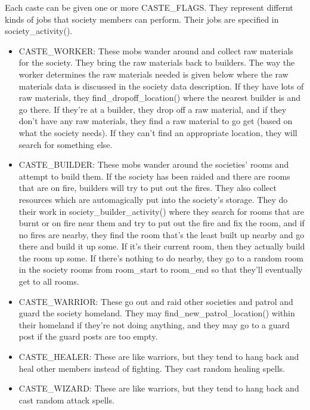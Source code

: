 Each caste can be given one or more CASTE\_FLAGS. They represent differnt
kinds of jobs that society members can perform. Their jobs are specified
in society\_activity().

\begin{itemize}

\item CASTE\_WORKER: These mobs wander around and collect raw materials for
  the society. They bring the raw materials back to builders. The way the
worker determines the raw materials needed is given below where the
raw materials data is discussed in the society data description.
If they have lots of raw materials, they find\_dropoff\_location()
where the nearest builder is and go there. If they're at a builder,
they drop off a raw material, and if they don't have any raw
materials, they find a raw material to go get (based on what the
society needs). If they can't find an appropriate location, they will
search for something else.

\item CASTE\_BUILDER: These mobs wander around the societies' rooms and
  attempt to build them. If the society has been raided and there are
rooms that are on fire, builders will try to put out the fires. They
also collect resources which are automagically put into the society's 
storage. They do their work in society\_builder\_activity() where they
search for rooms that are burnt or on fire near them and try to
put out the fire and fix the room, and if no fires are nearby, they
find the room that's the least built up nearby and go there and
build it up some. If it's their current room, then they actually
build the room up some. If there's nothing to do nearby, they
go to a random room in the society rooms from room\_start to room\_end
so that they'll eventually get to all rooms.

\item CASTE\_WARRIOR: These go out and raid other societies and
patrol and guard the society homeland. They may find\_new\_patrol\_location()
within their homeland if they're not doing anything, and they may
go to a guard post if the guard posts are too empty.
 
\item CASTE\_HEALER: These are like warriors, but they tend to hang
back and heal other members instead of fighting. They cast random
healing spells.

\item CASTE\_WIZARD: These are like warriors, but they tend to hang back
and cast random attack spells.


\end{itemize}
